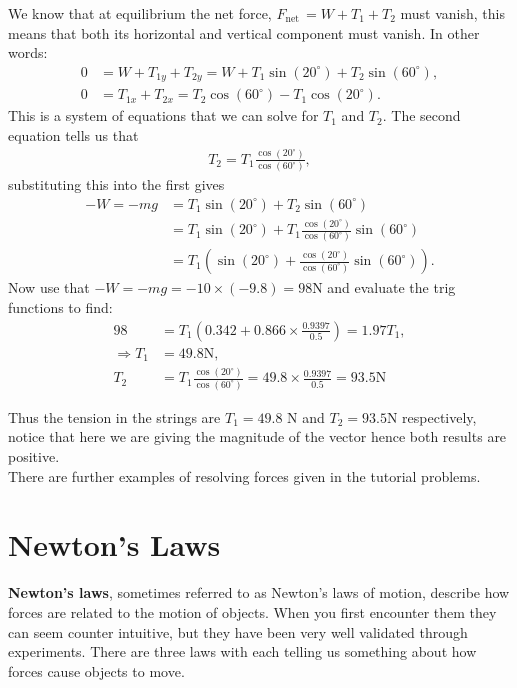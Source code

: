 \documentclass[a4paper,12pt]{book}
\begin{document}
We know that at equilibrium the net force, $F_{\text{net}~}=W+T_{1}+T_{2}$ must vanish, this means that both its horizontal and vertical component must vanish. In other words:
\begin{align}
0&=W+T_{1y}+T_{2y}=W +T_{1}\sin(20^{\circ})+T_{2}\sin(60^{\circ}) \label{eq: vertical force components},\\
0&=T_{1x}+T_{2x}= T_{2}\cos(60^{\circ}) -T_{1}\cos(20^{\circ}) \label{eq: horizontal force components}.
\end{align}
This is a system of equations that we can solve for $T_{1}$ and $T_{2}$. The second equation tells us that 
\begin{align*}
T_{2}=T_{1}\frac{\cos(20^{\circ})}{\cos(60^{\circ})},
\end{align*}
substituting this into the first gives
\begin{align*}
-W=-mg	&=T_{1}\sin(20^{\circ})+T_{2}\sin(60^{\circ})\\
		&=T_{1}\sin(20^{\circ})+T_{1}\frac{\cos(20^{\circ})}{\cos(60^{\circ})}\sin(60^{\circ})\\
		&=T_{1}\left(\sin(20^{\circ})+\frac{\cos(20^{\circ})}{\cos(60^{\circ})}\sin(60^{\circ})\right).
\end{align*}
Now use that $-W=-mg=-10\times (-9.8)=98\text{N}$ and evaluate the trig functions to find:
\begin{align*}
98&=T_{1}\left(0.342+0.866\times\frac{0.9397}{0.5}\right)=1.97T_{1},\\
\Rightarrow T_{1}&=49.8\text{N},\\
T_{2}&=T_{1}\frac{\cos(20^{\circ})}{\cos(60^{\circ})}=49.8\times \frac{0.9397}{0.5}=93.5\text{N}
\end{align*}

Thus the tension in the strings are $T_{1}=49.8$ N and $T_{2}=93.5$N respectively, notice that here we are giving the magnitude of the vector hence both results are positive.\\

There are further examples of resolving forces given in the tutorial problems.

\section{Newton's Laws}
\textbf{Newton's laws}, sometimes referred to as Newton's laws of motion, describe how forces are related to the motion of objects. When you first encounter them they can seem counter intuitive, but they have been very well validated through experiments. There are three laws with each telling us something about how forces cause objects to move.
\end{document}
